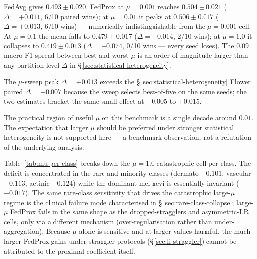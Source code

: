 \documentclass[11pt,a4paper]{report}
\begin{document}
FedAvg gives $0.493 \pm 0.020$. FedProx at $\mu = 0.001$ reaches
$0.504 \pm 0.021$ ($\Delta = +0.011$, 6/10 paired wins); at $\mu = 0.01$ it
peaks at $0.506 \pm 0.017$ ($\Delta = +0.013$, 6/10 wins) --- numerically
indistinguishable from the $\mu = 0.001$ cell. At $\mu = 0.1$ the mean falls
to $0.479 \pm 0.017$ ($\Delta = -0.014$, 2/10 wins); at $\mu = 1.0$ it
collapses to $0.419 \pm 0.013$ ($\Delta = -0.074$, 0/10 wins --- every seed
loses). The $0.09$ macro-F1 spread between best and worst $\mu$ is an order
of magnitude larger than any partition-level $\Delta$ in
\S\,\ref{sec:statistical-heterogeneity}.

The $\mu$-sweep peak $\Delta = +0.013$ exceeds the
\S\,\ref{sec:statistical-heterogeneity} Flower paired $\Delta = +0.007$
because the sweep selects best-of-five on the same seeds; the two estimates
bracket the same small effect at $+0.005$ to $+0.015$.

The practical region of useful $\mu$ on this benchmark is a single decade
around $0.01$. The expectation that larger $\mu$ should be preferred under
stronger statistical heterogeneity is not supported here --- a benchmark
observation, not a refutation of the underlying analysis.

Table~\ref{tab:mu-per-class} breaks down the $\mu = 1.0$ catastrophic cell
per class. The deficit is concentrated in the rare and minority classes
(dermato $-0.101$, vascular $-0.113$, actinic $-0.124$) while the dominant
mel-nevi is essentially invariant ($-0.017$). The same rare-class
sensitivity that drives the catastrophic large-$\mu$ regime is the
clinical failure mode characterised in
\S\,\ref{sec:rare-class-collapse}; large-$\mu$ FedProx fails in the same
shape as the dropped-stragglers and asymmetric-LR cells, only via a
different mechanism (over-regularisation rather than under-aggregation).
Because $\mu$ alone is sensitive and at larger values harmful, the much
larger FedProx gains under straggler protocols
(\S\,\ref{sec:li-straggler}) cannot be attributed to the proximal
coefficient itself.


\end{document}

